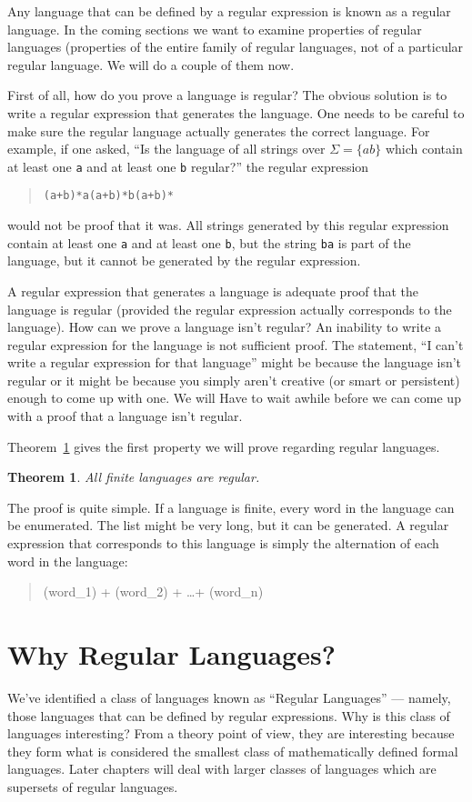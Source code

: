 \documentclass[letterpaper,12pt,openany,reqno]{book}%
\newcommand{\code}[1] {\lstinline[breaklines=yes,breakatwhitespace=yes]{#1}}
\newtheorem{theorem}{Theorem}
\begin{document}
Any language that can be defined by a regular expression is known as a regular language. In the coming sections we want to examine properties of regular languages (properties of the entire family of regular languages, not of a particular regular language. We will do a couple of them now.

First of all, how do you prove a language is regular? The obvious solution is to write a regular expression that generates the language. One needs to be careful to make sure the regular language actually generates the correct language. For example, if one asked, ``Is the language of all strings over $\Sigma = \{a b\}$ which contain at least one \code{a} and at least one \code{b} regular?''
 the regular expression
\begin{quote}
\code{(a+b)*a(a+b)*b(a+b)*}
\end{quote}
would not be proof that it was. All strings generated by this regular expression contain at least one \code{a} and at least one \code{b}, but the string \code{ba} is part of the language, but it cannot be generated by the regular expression.

A regular expression that generates a language is adequate proof that the language is regular (provided the regular expression actually corresponds to the language). How can we prove a language isn't regular? An inability to write a regular expression for the language is not sufficient proof. The statement, ``I can't write a regular expression for that language'' might be because the language isn't regular or it might be because you simply aren't creative (or smart or persistent) enough to come up with one. We will Have to wait awhile before we can come up with a proof that a language isn't regular.

Theorem~\ref{TH.finite.languages} gives the first property we will prove regarding regular languages.
\begin{theorem}
\label{TH.finite.languages}
All finite languages are regular.
\end{theorem}

The proof is quite simple. If a language is finite, every word in the language can be enumerated. The list might be very long, but it can be generated. A regular expression that corresponds to this language is simply the alternation of each word in the language:
\begin{quote}
(word\_1) + (word\_2) + \dots + (word\_n)
\end{quote}

\section{Why Regular Languages?}
We've identified a class of languages known as ``Regular Languages'' --- namely, those languages that can be defined by regular expressions. Why is this class of languages interesting? From a theory point of view, they are interesting because they form what is considered the smallest class of mathematically defined formal languages. Later chapters will deal with larger classes of languages which are supersets of regular languages. 
\end{document}
